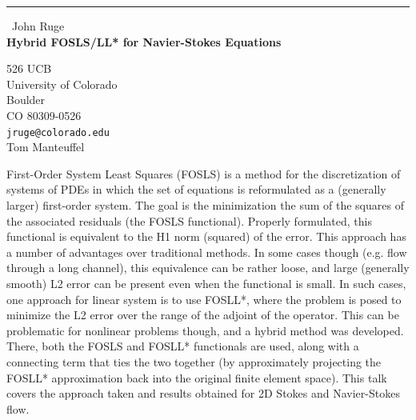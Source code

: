 \documentclass{report}
\begin{document}
\begin{center}
\rule{6in}{1pt} \
{\large John Ruge \\
{\bf Hybrid FOSLS/LL* for Navier-Stokes Equations}}

526 UCB \\ University of Colorado \\ Boulder \\ CO 80309-0526
\\
{\tt jruge@colorado.edu}\\
Tom Manteuffel\end{center}

First-Order System Least Squares (FOSLS) is a method for the
discretization of systems of PDEs in which the set of equations is
reformulated as a (generally larger) first-order system. The goal is the
minimization the sum of the squares of the associated residuals (the
FOSLS functional). Properly formulated, this functional is equivalent to
the H1 norm (squared) of the error. This approach has a number of
advantages over traditional methods. In some cases though (e.g. flow
through a long channel), this equivalence can be rather loose, and large
(generally smooth) L2 error can be present even when the functional is
small. In such cases, one approach for linear system is to use FOSLL*,
where the problem is posed to minimize the L2 error over the range of the
adjoint of the operator. This can be problematic for nonlinear problems
though, and a hybrid method was developed. There, both the FOSLS and
FOSLL* functionals are used, along with a connecting term that ties the
two together (by approximately projecting the FOSLL* approximation back
into the original finite element space). This talk covers the approach
taken and results obtained for 2D Stokes and Navier-Stokes flow.
\end{document}
